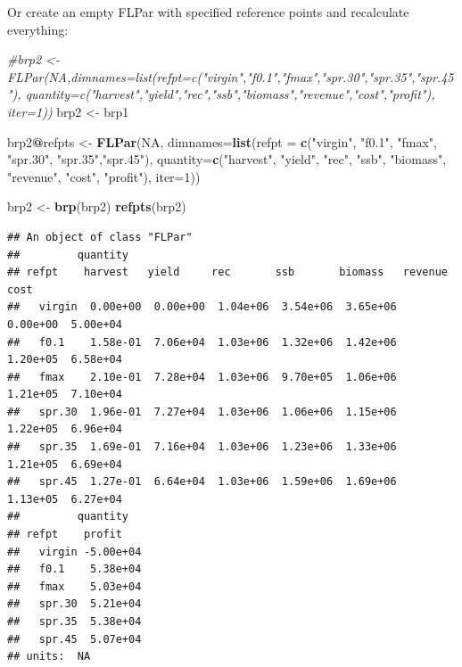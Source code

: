 \documentclass[
]{book}
\newenvironment{Shaded}{\begin{snugshade}}{\end{snugshade}}
\newcommand{\AttributeTok}[1]{\textcolor[rgb]{0.13,0.29,0.53}{#1}}
\newcommand{\CommentTok}[1]{\textcolor[rgb]{0.56,0.35,0.01}{\textit{#1}}}
\newcommand{\ConstantTok}[1]{\textcolor[rgb]{0.56,0.35,0.01}{#1}}
\newcommand{\DecValTok}[1]{\textcolor[rgb]{0.00,0.00,0.81}{#1}}
\newcommand{\FunctionTok}[1]{\textcolor[rgb]{0.13,0.29,0.53}{\textbf{#1}}}
\newcommand{\NormalTok}[1]{#1}
\newcommand{\OtherTok}[1]{\textcolor[rgb]{0.56,0.35,0.01}{#1}}
\newcommand{\SpecialCharTok}[1]{\textcolor[rgb]{0.81,0.36,0.00}{\textbf{#1}}}
\newcommand{\StringTok}[1]{\textcolor[rgb]{0.31,0.60,0.02}{#1}}
\begin{document}
Or create an empty FLPar with specified reference points and recalculate everything:

\begin{Shaded}
\begin{Highlighting}[]
\CommentTok{\#brp2 \textless{}{-} FLPar(NA,dimnames=list(refpt=c("virgin","f0.1","fmax","spr.30","spr.35","spr.45"), quantity=c("harvest","yield","rec","ssb","biomass","revenue","cost","profit"), iter=1))}
\NormalTok{brp2 }\OtherTok{\textless{}{-}}\NormalTok{ brp1}

\NormalTok{brp2}\SpecialCharTok{@}\NormalTok{refpts }\OtherTok{\textless{}{-}} \FunctionTok{FLPar}\NormalTok{(}\ConstantTok{NA}\NormalTok{, }\AttributeTok{dimnames=}\FunctionTok{list}\NormalTok{(}\AttributeTok{refpt =} \FunctionTok{c}\NormalTok{(}\StringTok{"virgin"}\NormalTok{, }\StringTok{"f0.1"}\NormalTok{, }\StringTok{"fmax"}\NormalTok{, }\StringTok{"spr.30"}\NormalTok{, }\StringTok{"spr.35"}\NormalTok{,}\StringTok{"spr.45"}\NormalTok{), }\AttributeTok{quantity=}\FunctionTok{c}\NormalTok{(}\StringTok{"harvest"}\NormalTok{, }\StringTok{"yield"}\NormalTok{, }\StringTok{"rec"}\NormalTok{, }\StringTok{"ssb"}\NormalTok{, }\StringTok{"biomass"}\NormalTok{, }\StringTok{"revenue"}\NormalTok{, }\StringTok{"cost"}\NormalTok{, }\StringTok{"profit"}\NormalTok{), }\AttributeTok{iter=}\DecValTok{1}\NormalTok{))}

\NormalTok{brp2 }\OtherTok{\textless{}{-}} \FunctionTok{brp}\NormalTok{(brp2)}
\FunctionTok{refpts}\NormalTok{(brp2)}
\end{Highlighting}
\end{Shaded}

\begin{verbatim}
## An object of class "FLPar"
##         quantity
## refpt    harvest   yield     rec       ssb       biomass   revenue   cost     
##   virgin  0.00e+00  0.00e+00  1.04e+06  3.54e+06  3.65e+06  0.00e+00  5.00e+04
##   f0.1    1.58e-01  7.06e+04  1.03e+06  1.32e+06  1.42e+06  1.20e+05  6.58e+04
##   fmax    2.10e-01  7.28e+04  1.03e+06  9.70e+05  1.06e+06  1.21e+05  7.10e+04
##   spr.30  1.96e-01  7.27e+04  1.03e+06  1.06e+06  1.15e+06  1.22e+05  6.96e+04
##   spr.35  1.69e-01  7.16e+04  1.03e+06  1.23e+06  1.33e+06  1.21e+05  6.69e+04
##   spr.45  1.27e-01  6.64e+04  1.03e+06  1.59e+06  1.69e+06  1.13e+05  6.27e+04
##         quantity
## refpt    profit   
##   virgin -5.00e+04
##   f0.1    5.38e+04
##   fmax    5.03e+04
##   spr.30  5.21e+04
##   spr.35  5.38e+04
##   spr.45  5.07e+04
## units:  NA
\end{verbatim}
\end{document}
